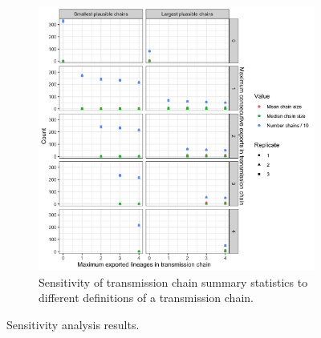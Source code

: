 \documentclass[9pt,twoside,lineno]{pnas-new}
\begin{document}
\begin{figure}[H]
\begin{subfigure}[b]{0.95\textwidth}
\centering
\includegraphics[width = 11.4cm]{figures/fig_SX_sensitivity_chain_defn.png}
\caption{Sensitivity of transmission chain summary statistics to different definitions of a transmission chain.}  
\end{subfigure}
\caption{Sensitivity analysis results.}
\label{fig:sensitivity_figs}
\end{figure}
\end{document}

